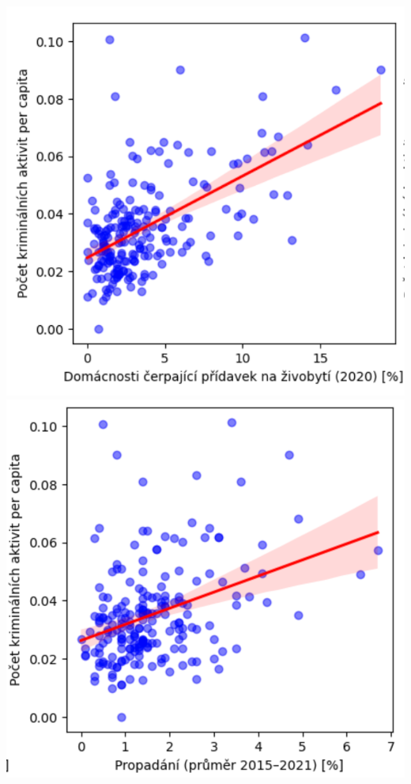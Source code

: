\documentclass[a4paper, 12pt]{article}
\begin{document}
\begin{center}
    \includegraphics[width=.8\textwidth]{corr3.png}
    \includegraphics[width=.8\textwidth]{corr4.png}
\end{center}
\end{document}
